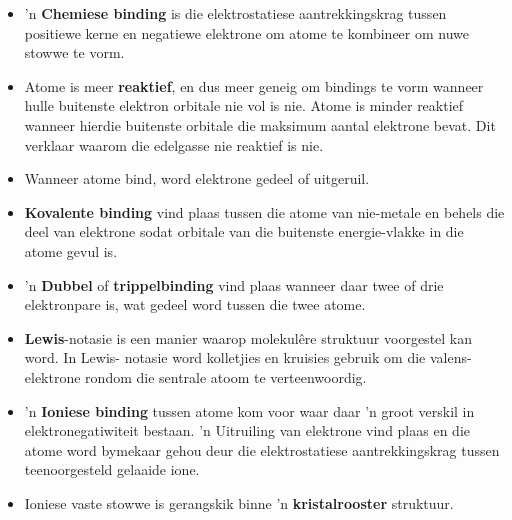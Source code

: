 
            \nopagebreak
      \label{m38689*id147386}\begin{itemize}[noitemsep]
            \label{m38689*uid136}\item  'n \textbf{Chemiese binding} is die elektrostatiese aantrekkingskrag tussen positiewe kerne en negatiewe elektrone om atome te kombineer om nuwe stowwe te vorm.
\label{m38689*uid137}\item Atome is meer \textbf{reaktief}, en dus meer geneig om bindings te vorm wanneer hulle buitenste elektron orbitale nie vol is nie. Atome is minder reaktief wanneer hierdie buitenste orbitale die maksimum aantal elektrone bevat. Dit verklaar waarom die edelgasse nie reaktief is nie.
\label{m38689*uid142}\item Wanneer atome bind, word elektrone gedeel of uitgeruil.
\label{m38689*uid143}\item \textbf{Kovalente binding} vind plaas tussen die atome van nie-metale en behels die deel van elektrone sodat orbitale van die buitenste energie-vlakke in die atome gevul is.
\label{m38689*uid145}\item  'n \textbf{Dubbel} of \textbf{trippelbinding} vind plaas wanneer daar twee of drie elektronpare is, wat gedeel word tussen die twee atome.
\label{m38689*uid147}\item \textbf{Lewis}-notasie is een manier waarop molekulêre struktuur voorgestel kan word. In Lewis- notasie word kolletjies en kruisies gebruik om die valens-elektrone rondom die sentrale atoom te verteenwoordig.
\label{m38689*uid150}\item  'n \textbf{Ioniese binding} tussen atome kom voor waar daar  'n groot verskil in elektronegatiwiteit bestaan.  'n Uitruiling van elektrone vind plaas en die atome word bymekaar gehou deur die elektrostatiese  aantrekkingskrag tussen teenoorgesteld gelaaide ione.
\label{m38689*uid151}\item Ioniese vaste stowwe is gerangskik binne  'n \textbf{kristalrooster} struktuur.

\end{itemize}
